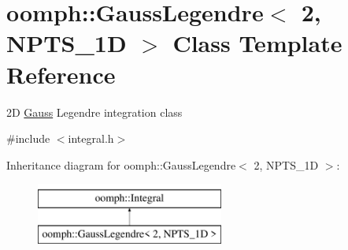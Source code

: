\hypertarget{classoomph_1_1GaussLegendre_3_012_00_01NPTS__1D_01_4}{}\section{oomph\+:\+:Gauss\+Legendre$<$ 2, N\+P\+T\+S\+\_\+1D $>$ Class Template Reference}
\label{classoomph_1_1GaussLegendre_3_012_00_01NPTS__1D_01_4}


2D \hyperlink{classoomph_1_1Gauss}{Gauss} Legendre integration class  




{\ttfamily \#include $<$integral.\+h$>$}

Inheritance diagram for oomph\+:\+:Gauss\+Legendre$<$ 2, N\+P\+T\+S\+\_\+1D $>$\+:\begin{figure}[H]
\begin{center}
\leavevmode
\includegraphics[height=2.000000cm]{classoomph_1_1GaussLegendre_3_012_00_01NPTS__1D_01_4}
\end{center}
\end{figure}
